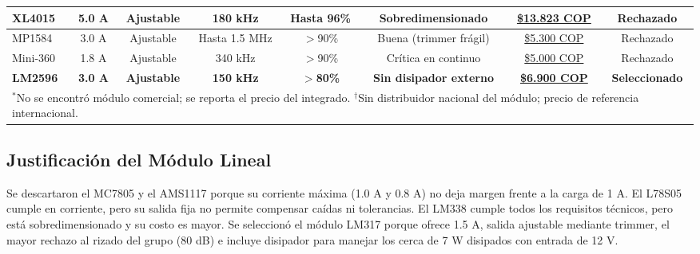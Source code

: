 \documentclass[conference]{IEEEtran}
\begin{document}
\begin{table}[!t]
\begin{center}
{\begin{tabular}{|l|c|c|c|c|c|c|c|}
\hline
XL4015 & 5.0 A & Ajustable & 180 kHz & Hasta 96\% & Sobredimensionado & \href{https://www.vistronica.com/fuente-de-voltaje/conversores-dc-dc/convertidor-dc-dc-buck-xl4015-de-5a-con-voltaje-y-corriente-ajustable-detail.html}{\color{blue}\$13.823 COP} & Rechazado \\
\hline
MP1584 & 3.0 A & Ajustable & Hasta 1.5 MHz & $>$90\% & Buena (trimmer frágil) & \href{https://electronilab.co/tienda/modulo-mp1584-convertidor-de-voltaje-dc-dc-buck-0-8v-20v-3a/}{\color{blue}\$5.300 COP} & Rechazado \\
\hline
Mini-360 & 1.8 A & Ajustable & 340 kHz & $>$90\% & Crítica en continuo & \href{https://www.mactronica.com.co/convertidor-dc-dc-mini-360-reductor-mp2307-3a-475v-a-23v}{\color{blue}\$5.000 COP} & Rechazado \\
\hline
\textbf{LM2596} & \textbf{3.0 A} & \textbf{Ajustable} & \textbf{150 kHz} & \textbf{$>$80\%} & \textbf{Sin disipador externo} & \href{https://electronilab.co/tienda/modulo-lm2596-convertidor-de-voltaje-dc-dc-buck-1-25v-35v/}{\color{blue}\textbf{\$6.900 COP}} & \textbf{Seleccionado} \\
\hline
\multicolumn{8}{|l|}{\footnotesize $^{*}$No se encontró módulo comercial; se reporta el precio del integrado. \quad $^{\dagger}$Sin distribuidor nacional del módulo; precio de referencia internacional.} \\
\hline
\end{tabular}%
}
\label{tab:comparativa_modulos}
\end{center}
\end{table}

\FloatBarrier
\subsection{\textbf{Justificación del Módulo Lineal}}
Se descartaron el MC7805 \cite{mc7805} y el AMS1117 \cite{ams1117} porque su corriente máxima (1.0 A y 0.8 A) no deja margen frente a la carga de 1 A. El L78S05 \cite{l78s05} cumple en corriente, pero su salida fija no permite compensar caídas ni tolerancias. El LM338 \cite{lm338} cumple todos los requisitos técnicos, pero está sobredimensionado y su costo es mayor. Se seleccionó el módulo LM317 \cite{lm317} porque ofrece 1.5 A, salida ajustable mediante trimmer, el mayor rechazo al rizado del grupo (80 dB) e incluye disipador para manejar los cerca de 7 W disipados con entrada de 12 V.

\FloatBarrier
\end{document}
